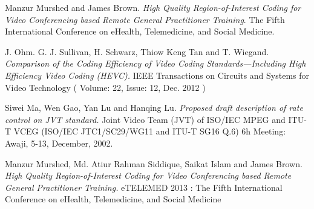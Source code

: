 \documentclass[11pt]{article} %
\begin{document}
\begin{thebibliography}{9}
Manzur Murshed and James Brown. 
\textit{High Quality Region-of-Interest Coding for Video Conferencing based Remote General Practitioner Training}. 
The Fifth International Conference on eHealth, Telemedicine, and Social Medicine.

J. Ohm. G. J. Sullivan, H. Schwarz, Thiow Keng Tan and T. Wiegand.
\textit{Comparison of the Coding Efficiency of Video Coding Standards—Including High Efficiency Video Coding (HEVC).}
 IEEE Transactions on Circuits and Systems for Video Technology ( Volume: 22, Issue: 12, Dec. 2012 )

Siwei Ma, Wen Gao, Yan Lu and Hanqing Lu.
\textit{Proposed draft description of rate control on JVT standard. }
Joint Video Team (JVT) of ISO/IEC MPEG and ITU-T VCEG (ISO/IEC JTC1/SC29/WG11 and ITU-T SG16 Q.6) 6h Meeting: Awaji, 5-13, December, 2002.

Manzur Murshed, Md. Atiur Rahman Siddique, Saikat Islam and James Brown.
\textit{High Quality Region-of-Interest Coding for Video Conferencing based Remote General Practitioner Training.}
eTELEMED 2013 : The Fifth International Conference on eHealth, Telemedicine, and Social Medicine

\end{thebibliography}
\end{document}
